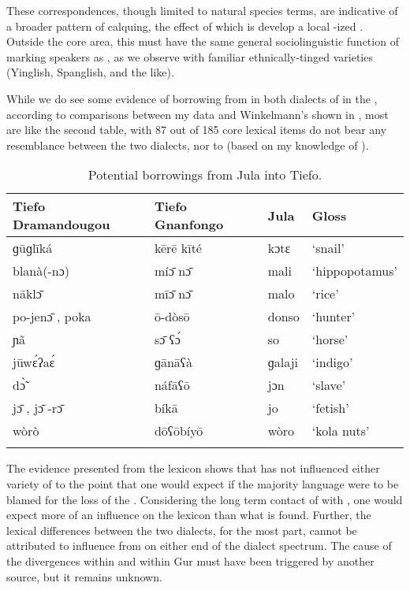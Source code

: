 \documentclass[output=paper,
modfonts
]{langscibook}
\begin{document}
These correspondences, though limited to natural species terms, are indicative of a broader pattern of calquing, the effect of which is develop a local -ized . Outside the core  area, this must have the same general sociolinguistic function of marking speakers as , as we observe with familiar ethnically-tinged  varieties (Yinglish, Spanglish, and the like).

While we do see some evidence of borrowing from  in both dialects of  in the , according to comparisons between my data and Winkelmann’s shown in , most are like the second table, with 87 out of 185 core lexical items do not bear any resemblance between the two dialects, nor to  (based on my knowledge of ).

\begin{table}
\caption{Potential borrowings from Jula into Tiefo.}
\label{tab:hangtan:10}
\begin{tabularx}{\textwidth}{lXXX}
\lsptoprule
{\bfseries  {Tiefo} Dramandougou} & {\bfseries  {Tiefo} Gnanfongo} & {\bfseries Jula} & {\bfseries Gloss}\\
\midrule
{ ɡūɡlīká} & { kērē kīté} & { kɔtɛ} & { ‘snail’}\\
{ blanà(-nɔ)} & { {mí}\={ɔ} {n}\={ɔ}} & { mali} & { ‘hippopotamus’}\\
{ {nākl}\={ɔ}} & { {mī}\={ɔ} {n}\={ɔ}} & { malo} & { ‘rice’}\\
{ {po-jen}\={ɔ} {,} {poka}} & { \=o-dòs\=o} & { donso} & { ‘hunter’}\\
{ ɲã} & { {s}\={ɔ} {ʕ}{}{\'{ɔ}}} & { so} & { ‘horse’}\\
{ jūw{\'{ɛ}}ʔa{\'{ɛ}}} & { ɡānāʕà} & { ɡalaji} & { ‘indigo’}\\
{ d\`{\~{{ɔ}}}} & { náfāʕ\=o} & { jɔn} & { ‘slave’}\\
{ {j}\={ɔ} {,} {j}\={ɔ} {{}-r}\={ɔ}} & { bíkā} & { jo} & { ‘fetish’}\\
{ wòrò} & { d\=oʕ\=obíy\=o} & { wòro} & { ‘kola nuts’}\\
\lspbottomrule
\end{tabularx}


\end{table}

The evidence presented from the lexicon shows that  has not influenced either variety of  to the point that one would expect if the majority language were to be blamed for the loss of the . Considering the long term contact of  with , one would expect more of an influence on the lexicon than what is found. Further, the lexical differences between the two dialects, for the most part, cannot be attributed to influence from  on either end of the dialect spectrum. The cause of the divergences within  and within Gur must have been triggered by another source, but it remains unknown.
\end{document}

